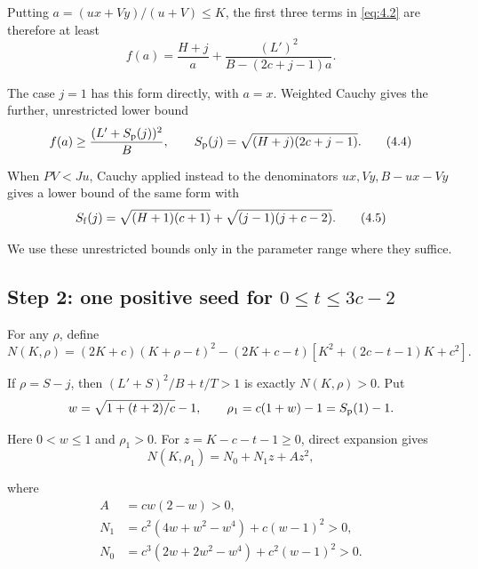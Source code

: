 \documentclass[11pt,a4paper]{article}
\begin{document}
Putting \(a=(ux+Vy)/(u+V)\le K\), the first three terms in \eqref{eq:4.2} are therefore at least
\begin{equation}
f(a)=\frac{H+j}{a}
       +\frac{(L')^2}{B-(2c+j-1)a}.
\tag{4.3}
\label{eq:4.3}
\end{equation}

The case \(j=1\) has this form directly, with \(a=x\). Weighted Cauchy gives the further, unrestricted lower bound
\begin{equation}
f(a)\ge\frac{(L'+S_{\rm p}(j))^2}{B},
\qquad S_{\rm p}(j)=\sqrt{(H+j)(2c+j-1)}.
\tag{4.4}
\label{eq:4.4}
\end{equation}

When \(PV<Ju\), Cauchy applied instead to the denominators \(ux,Vy,B-ux-Vy\) gives a lower bound of the same form with
\begin{equation}
S_{\rm f}(j)=\sqrt{(H+1)(c+1)}
             +\sqrt{(j-1)(j+c-2)}.
\tag{4.5}
\label{eq:4.5}
\end{equation}

We use these unrestricted bounds only in the parameter range where they suffice.

\hypertarget{step-2-one-positive-seed-for-0le-tle3c-2}{%
\subsection*{\texorpdfstring{Step 2: one positive seed for \(0\le t\le3c-2\)}{Step 2: one positive seed for 0\textbackslash le t\textbackslash le3c-2}}\label{step-2-one-positive-seed-for-0le-tle3c-2}}

For any \(\rho\), define
\begin{equation}
N(K,\rho)
=(2K+c)(K+\rho-t)^2
 -(2K+c-t)[K^2+(2c-t-1)K+c^2].
\tag{4.6}
\label{eq:4.6}
\end{equation}

If \(\rho=S-j\), then \((L'+S)^2/B+t/T>1\) is exactly \(N(K,\rho)>0\). Put
\[
w=\sqrt{1+(t+2)/c}-1,\qquad
\rho_1=c(1+w)-1=S_{\rm p}(1)-1.
\]

Here \(0<w\le1\) and \(\rho_1>0\). For \(z=K-c-t-1\ge0\), direct expansion gives
\begin{equation}
N(K,\rho_1)=N_0+N_1z+Az^2,
\tag{4.7}
\label{eq:4.7}
\end{equation}

where
\begin{equation}
\begin{aligned}
A&=cw(2-w)>0,\\
N_1&=c^2(4w+w^2-w^4)+c(w-1)^2>0,\\
N_0&=c^3(2w+2w^2-w^4)+c^2(w-1)^2>0.
\end{aligned}
\tag{4.8}
\label{eq:4.8}
\end{equation}
\end{document}
